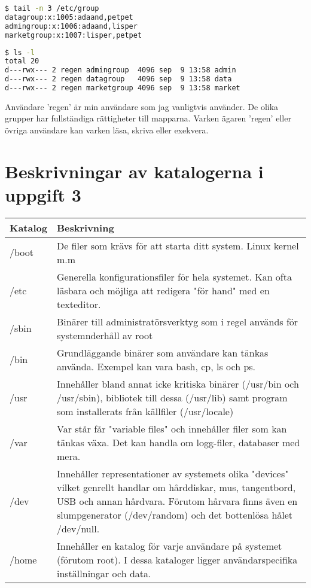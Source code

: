 \documentclass[11pt]{article}
\begin{document}
\begin{lstlisting}[language=bash,caption={Utdrag från /etc/group}]
$ tail -n 3 /etc/group
datagroup:x:1005:adaand,petpet
admingroup:x:1006:adaand,lisper
marketgroup:x:1007:lisper,petpet
\end{lstlisting}

\begin{lstlisting}[language=bash,caption={Resultat av ls -l}]
$ ls -l
total 20
d---rwx--- 2 regen admingroup  4096 sep  9 13:58 admin
d---rwx--- 2 regen datagroup   4096 sep  9 13:58 data
d---rwx--- 2 regen marketgroup 4096 sep  9 13:58 market
\end{lstlisting}

Användare 'regen' är min användare som jag vanligtvis använder. De olika grupper har fullständiga rättigheter till mapparna. Varken ägaren 'regen' eller övriga användare kan varken läsa, skriva eller exekvera.
     
\section{Beskrivningar av katalogerna i uppgift 3}
\begin{center}
    \begin{longtable}{ | l | p{10cm} |}
    \hline
    Katalog & Beskrivning \\ \hline   
    /boot & De filer som krävs för att starta ditt system. Linux kernel m.m \\ \hline
	/etc & Generella konfigurationsfiler för hela systemet. Kan ofta läsbara och möjliga att redigera "för hand" med en texteditor. \\ \hline
	/sbin & Binärer till administratörsverktyg som i regel används för systemnderhåll av root\\ \hline
	/bin & Grundläggande binärer som användare kan tänkas använda. Exempel kan vara bash, cp, ls och ps. \\ \hline
	/usr & Innehåller bland annat icke kritiska binärer (/usr/bin och /usr/sbin), bibliotek till dessa (/usr/lib) samt program som installerats från källfiler (/usr/locale) \\ \hline
	/var & Var står får "variable files" och innehåller filer som kan tänkas växa. Det kan handla om logg-filer, databaser med mera.\\ \hline
	/dev & Innehåller representationer av systemets olika "devices" vilket genrellt handlar om hårddiskar, mus, tangentbord, USB och annan hårdvara. Förutom hårvara finns även en slumpgenerator (/dev/random) och det bottenlösa hålet /dev/null. \\ \hline
	/home &  Innehåller en katalog för varje användare på systemet (förutom root). I dessa kataloger ligger användarspecifika inställningar och data.\\ \hline
    \end{longtable}
\end{center}
    
\end{document}
